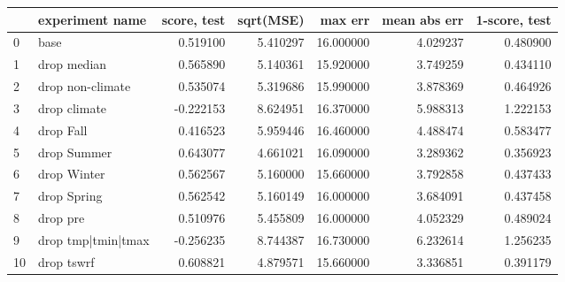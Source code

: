\begin{tabular}{llrrrrr}
\toprule
 & experiment name & score, test & sqrt(MSE) & max err & mean abs err & 1-score, test \\
\midrule
0 & base & 0.519100 & 5.410297 & 16.000000 & 4.029237 & 0.480900 \\
1 & drop median & 0.565890 & 5.140361 & 15.920000 & 3.749259 & 0.434110 \\
2 & drop non-climate & 0.535074 & 5.319686 & 15.990000 & 3.878369 & 0.464926 \\
3 & drop climate & -0.222153 & 8.624951 & 16.370000 & 5.988313 & 1.222153 \\
4 & drop Fall & 0.416523 & 5.959446 & 16.460000 & 4.488474 & 0.583477 \\
5 & drop Summer & 0.643077 & 4.661021 & 16.090000 & 3.289362 & 0.356923 \\
6 & drop Winter & 0.562567 & 5.160000 & 15.660000 & 3.792858 & 0.437433 \\
7 & drop Spring & 0.562542 & 5.160149 & 16.000000 & 3.684091 & 0.437458 \\
8 & drop pre & 0.510976 & 5.455809 & 16.000000 & 4.052329 & 0.489024 \\
9 & drop tmp|tmin|tmax & -0.256235 & 8.744387 & 16.730000 & 6.232614 & 1.256235 \\
10 & drop tswrf & 0.608821 & 4.879571 & 15.660000 & 3.336851 & 0.391179 \\
\bottomrule
\end{tabular}
